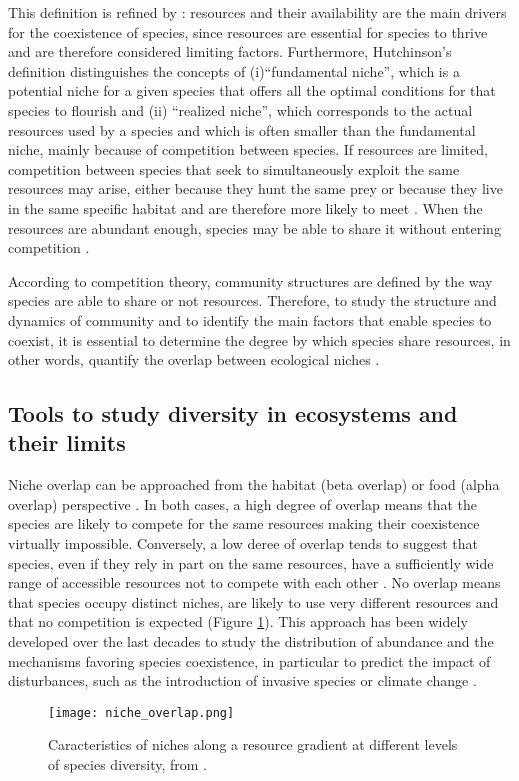 This definition is refined by \citet{hutchinson1957}: resources and their availability are the main drivers for the coexistence of species, since resources are essential for species to thrive and are therefore considered limiting factors. Furthermore, Hutchinson’s definition distinguishes the concepts of (i)``fundamental niche'', which is a potential niche for a given species that offers all the optimal conditions for that species to flourish and (ii) ``realized niche'', which corresponds to the actual resources used by a species and which is often smaller than the fundamental niche, mainly because of competition between species. If resources are limited, competition between species that seek to simultaneously exploit the same resources may arise, either because they hunt the same prey or because they live in the same specific habitat and are therefore more likely to meet \citep{blondel1979}. When the resources are abundant enough, species may be able to share it without entering competition \citep{nagelkerke2018}. 

According to competition theory, community structures are defined by the way species are able to share or not resources. Therefore, to study the structure and dynamics of community and to identify the main factors that enable species to coexist, it is essential to determine the degree by which species share resources, in other words, quantify the overlap between ecological niches \citep{geange2011}. 


\subsection{Tools to study diversity in ecosystems and their limits}

Niche overlap can be approached from the habitat (beta overlap) or food (alpha overlap) perspective \citep{mouillot2005}. In both cases, a high degree of overlap means that the species are likely to compete for the same resources making their coexistence virtually impossible. Conversely, a low deree of overlap tends to suggest that species, even if they rely in part on the same resources, have a sufficiently wide range of accessible resources not to compete with each other \citep{mouillot2005}. No overlap means that species occupy distinct niches, are likely to use very different resources and that no competition is expected (Figure \ref{fig:lr1}). This approach has been widely developed over the last decades to study the distribution of abundance and the mechanisms favoring species coexistence, in particular to predict the impact of disturbances, such as the introduction of invasive species or climate change \citep{albouy2011,geange2011, martini2020}. 
\begin{figure} [!htbp]
	\begin{center}
		\texttt{[image: niche\_overlap.png]}
	\end{center}
	\caption[Caracteristics of niches along a resource gradient]{Caracteristics of niches along a resource gradient at different levels of species diversity, from \citet{kim2020}.}
	\label{fig:lr1}
\end{figure}

